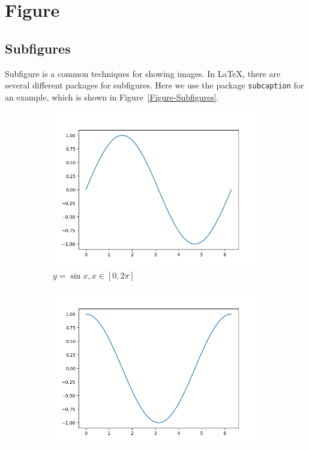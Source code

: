 \section{Figure}

\subsection{Subfigures}
Subfigure is a common techniques for showing images. In {\LaTeX}, there are several different packages for subfigures. Here we use the package \verb|subcaption| for an example, which is shown in Figure~\ref{Figure-Subfigures}.
\begin{figure}
    \centering
    \begin{subfigure}{0.3\linewidth}
        \includegraphics[width=\linewidth]{../figures/sin.png}
        \caption{\(y=\sin x, x\in[0,2\pi]\)}
    \end{subfigure}
    \begin{subfigure}{0.3\linewidth}
        \includegraphics[width=\linewidth]{../figures/cos.png}

\end{subfigure}
\end{figure}
